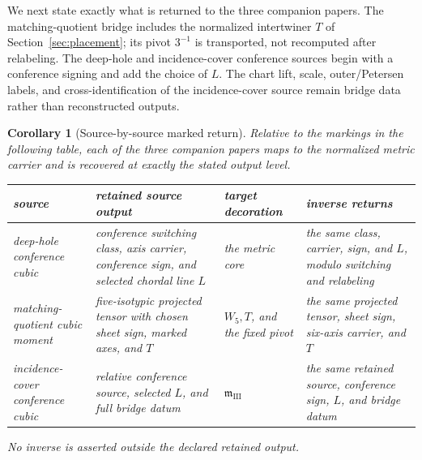 \documentclass[11pt]{article}
\newtheorem{corollary}[theorem]{Corollary}
\theoremstyle{definition}
\theoremstyle{remark}
\begin{document}
We next state exactly what is returned to the three companion papers.  The
matching-quotient bridge \cite{RuddFactorization2026} includes the normalized
intertwiner \(T\) of Section~\ref{sec:placement}; its pivot \(3^{-1}\) is
transported, not recomputed after relabeling.  The deep-hole and
incidence-cover conference sources
\cite{RuddRigidity2026,RuddPassages2026} begin with a conference signing and
add the choice of \(L\).  The chart lift, scale, outer/Petersen labels, and
cross-identification of the incidence-cover source \cite{RuddPassages2026}
remain bridge data rather than reconstructed outputs.

\begin{corollary}[Source-by-source marked return]
\label{cor:source-by-source-return}
Relative to the markings in the following table, each of the three companion
papers \cite{RuddRigidity2026,RuddFactorization2026,RuddPassages2026} maps
to the normalized metric carrier and is recovered at exactly the stated
output level.
\begin{center}
\small
\renewcommand{\arraystretch}{1.15}
\begin{tabular}{@{}>{\raggedright\arraybackslash}p{}
  >{\raggedright\arraybackslash}p{}
  >{\raggedright\arraybackslash}p{}
  >{\raggedright\arraybackslash}p{}@{}}
\toprule
source & retained source output & target decoration & inverse returns\\
\midrule
deep-hole conference cubic \cite{RuddRigidity2026} & conference switching
  class, axis carrier, conference sign, and selected chordal line \(L\) & the
  metric core & the same class, carrier, sign, and \(L\), modulo
  switching and relabeling\\
matching-quotient cubic moment \cite{RuddFactorization2026} & five-isotypic
  projected tensor with chosen sheet sign, marked axes, and \(T\) &
  \(W_5,T\), and the fixed pivot & the same projected tensor, sheet sign,
  six-axis carrier, and \(T\)\\
incidence-cover conference cubic \cite{RuddPassages2026} & relative conference
  source, selected \(L\), and full bridge datum &
  \(\mathfrak m_{\mathrm{III}}\) & the same retained source, conference sign,
  \(L\), and bridge datum\\
\bottomrule
\end{tabular}
\end{center}
No inverse is asserted outside the declared retained output.
\end{corollary}
\end{document}
